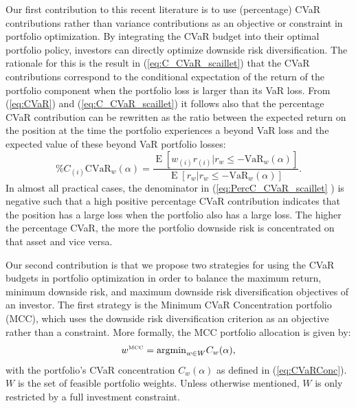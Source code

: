 \documentclass[12pt,a4paper]{article}
\DeclareMathOperator{\E}{\operatorname{E}}
\newcommand{\argmin}{{\operatorname{argmin}}}
\begin{document}
Our first contribution to this recent literature is to use (percentage) CVaR contributions rather than variance contributions as an objective or constraint in portfolio optimization. By integrating the CVaR budget into their optimal portfolio policy, investors can directly optimize downside risk diversification. The rationale for this is the result in (\ref{eq:C_CVaR_scaillet}) that the CVaR contributions correspond to the conditional expectation of the return of the portfolio component when the portfolio loss is larger than its VaR loss. From (\ref{eq:CVaR}) and (\ref{eq:C_CVaR_scaillet}) it follows also that the percentage CVaR contribution can be rewritten as the ratio between the expected return on the position at the time the portfolio experiences a beyond VaR loss and the expected value of these beyond VaR portfolio losses:
 \begin{equation} \%C_{(i)}\mbox{CVaR}_w(\alpha) = \frac{ \E[w_{(i)}r_{(i)} | r_w \leq -\mbox{VaR}_w(\alpha)] }{\E[r_w | r_w \leq -\mbox{VaR}_w(\alpha)]}. \label{eq:PercC_CVaR_scaillet} \end{equation}
In almost all practical cases, the denominator in (\ref{eq:PercC_CVaR_scaillet} ) is negative such that a high positive percentage CVaR contribution indicates that the position has a large loss when the portfolio also has a large loss. The higher the percentage CVaR, the more the portfolio downside risk is concentrated on that asset and vice versa.

 Our second contribution is that we propose two strategies for using the CVaR budgets in portfolio optimization in order to balance the maximum return, minimum downside risk, and maximum downside risk diversification objectives of an investor. The first strategy is the Minimum CVaR Concentration portfolio (MCC), which uses the downside risk diversification criterion as an objective rather than a constraint. More formally, the MCC portfolio allocation is given by:
\begin{equation}  w^{\mbox{\tiny MCC}} = \argmin_{w \in W} C_w(\alpha) , \label{eq:MCCportfolio} \end{equation}
with the portfolio's CVaR concentration $C_w(\alpha)$ as defined in (\ref{eq:CVaRConc}). $W$ is the set of feasible portfolio weights.
Unless otherwise mentioned, $W$ is only restricted by a full investment constraint.
\end{document}
